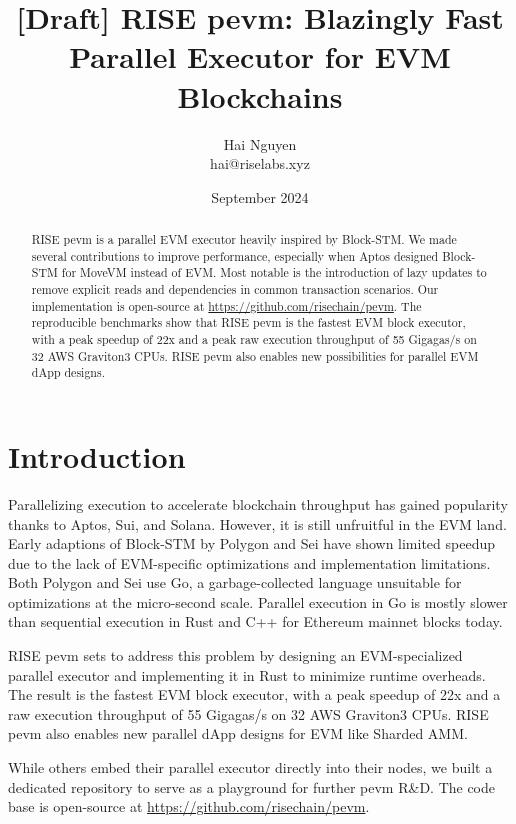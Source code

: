 \documentclass{article}
\title{[Draft] RISE pevm: Blazingly Fast Parallel Executor for EVM Blockchains}
\author{Hai Nguyen \\ hai@riselabs.xyz}
\date{September 2024}
\begin{document}
\maketitle

\begin{abstract}

    RISE pevm is a parallel EVM executor heavily inspired by Block-STM. We made several contributions to improve
    performance, especially when Aptos designed Block-STM for MoveVM instead of EVM. Most notable is the introduction
    of lazy updates to remove explicit reads and dependencies in common transaction scenarios. Our implementation is
    open-source at \url{https://github.com/risechain/pevm}. The reproducible benchmarks show that RISE pevm is the
    fastest EVM block executor, with a peak speedup of 22x and a peak raw execution throughput of 55 Gigagas/s on 32
    AWS Graviton3 CPUs. RISE pevm also enables new possibilities for parallel EVM dApp designs.

\end{abstract}

\section{Introduction}

Parallelizing execution to accelerate blockchain throughput has gained popularity thanks to Aptos, Sui, and Solana.
However, it is still unfruitful in the EVM land. Early adaptions of Block-STM\cite{blockstm} by Polygon and Sei have
shown limited speedup due to the lack of EVM-specific optimizations and implementation limitations. Both Polygon and
Sei use Go, a garbage-collected language unsuitable for optimizations at the micro-second scale. Parallel execution in
Go is mostly slower than sequential execution in Rust and C++ for Ethereum mainnet blocks today.

RISE pevm sets to address this problem by designing an EVM-specialized parallel executor and implementing it in
Rust to minimize runtime overheads. The result is the fastest EVM block executor, with a peak speedup of 22x and a
raw execution throughput of 55 Gigagas/s on 32 AWS Graviton3 CPUs. RISE pevm also enables new parallel dApp designs for
EVM like Sharded AMM\cite{samm}.

While others embed their parallel executor directly into their nodes, we built a dedicated repository to
serve as a playground for further pevm R\&D. The code base is open-source at \url{https://github.com/risechain/pevm}.
\end{document}
